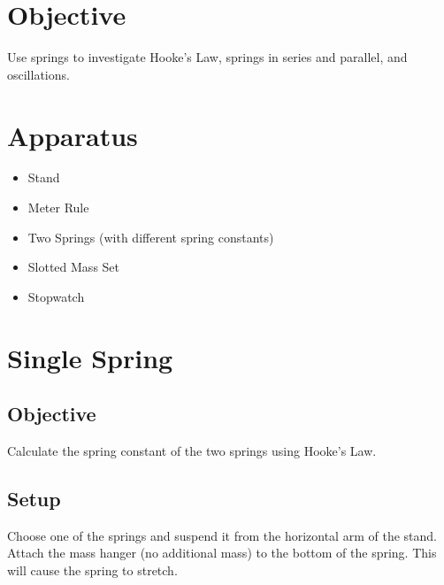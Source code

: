 \section*{Objective}

    Use springs to investigate Hooke's Law, springs in series and parallel, and oscillations.

\section*{Apparatus}

    \begin{itemize}

        \item Stand
        \item Meter Rule
        \item Two Springs (with different spring constants)
        \item Slotted Mass Set
        \item Stopwatch

    \end{itemize}

\setcounter{section}{0}
\section{Single Spring}\label{single_spring}

    \subsection*{Objective}

        Calculate the spring constant of the two springs using Hooke's Law.

    \subsection*{Setup}

        Choose one of the springs and suspend it from the horizontal arm of the stand. Attach the mass hanger (no additional mass) to the bottom of the spring. This will cause the spring to stretch.%

